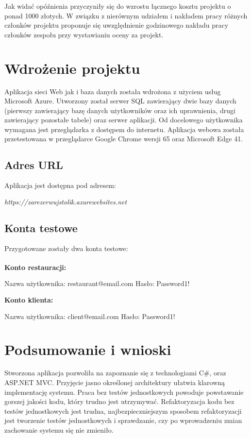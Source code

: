\documentclass{article}
\begin{document}
Jak widać opóźnienia przyczyniły się do wzrostu łącznego kosztu projektu o ponad 1000 złotych. W związku z nierównym udziałem i nakładem pracy różnych członków projektu proponuje się uwzględnienie godzinowego nakładu pracy członków zespołu przy wystawianiu oceny za projekt.


\section{Wdrożenie projektu}
Aplikacja sieci Web jak i baza danych została wdrożona z użyciem usług Microsoft Azure. Utworzony został serwer SQL zawierający dwie bazy danych (pierwszy zawierający bazę danych użytkowników oraz ich uprawnienia, drugi zawierający pozostałe tabele) oraz serwer aplikacji. Od docelowego użytkownika wymagana jest przeglądarka z dostępem do internetu. Aplikacja webowa została przetestowana w przeglądarce Google Chrome wersji 65 oraz Microsoft Edge 41.
\subsection{Adres URL}
Aplikacja jest dostępna pod adresem:
\begin{center}
\textit{https://zarezerwujstolik.azurewebsites.net}
\end{center}
\subsection{Konta testowe}
Przygotowane zostały dwa konta testowe:\\\\
\textbf{Konto restauracji:}
\begin{center}
Nazwa użytkownika: restaurant@email.com Hasło: Password1!
\end{center}
\textbf{Konto klienta:}
\begin{center}
Nazwa użytkownika: client@email.com Hasło: Password1!
\end{center}


\section{Podsumowanie i wnioski}

Stworzona aplikacja pozwoliła na zapoznanie się z technologiami C\#, oraz \\ ASP.NET MVC. Przyjęcie jasno określonej architektury ułatwia klarowną implementację systemu. Praca bez testów jednostkowych powoduje powstawanie gorszej jakości kodu, który trudno jest utrzymywać. Refaktoryzacja kodu bez testów jednostkowych jest trudna, najbezpieczniejszym sposobem refaktoryzacji jest tworzenie testów jednostkowych i sprawdzanie, czy po wprowadzeniu zmian zachowanie systemu się nie zmieniło.
\end{document}
